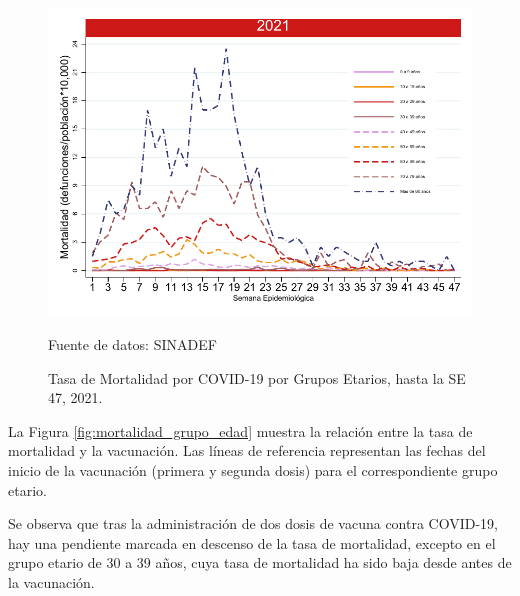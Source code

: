 \documentclass[12pt,a4paper,openany]{book}
\begin{document}
	\begin{figure}[h]
	\caption{Tasa de Mortalidad por COVID-19 por Grupos Etarios, hasta la SE 47, 2021.}\label{fig:mortalidad_edad}
	\begin{center}
		\includegraphics[width=0.65\linewidth]{../figuras/mortalidad_edad.pdf}
	\end{center}
	{\footnotesize Fuente de datos: SINADEF} 
	\end{figure}


	La Figura \ref{fig:mortalidad_grupo_edad} muestra la relación entre la tasa de mortalidad y la vacunación. Las líneas de referencia representan las fechas del inicio de la vacunación (primera y segunda dosis) para el correspondiente grupo etario. 
	
	Se observa que tras la administración de dos dosis de vacuna contra COVID-19,  hay una pendiente marcada en descenso de la tasa de mortalidad, excepto en el grupo etario de 30 a 39 años, cuya tasa de mortalidad ha sido baja desde antes de la vacunación.
\end{document}
